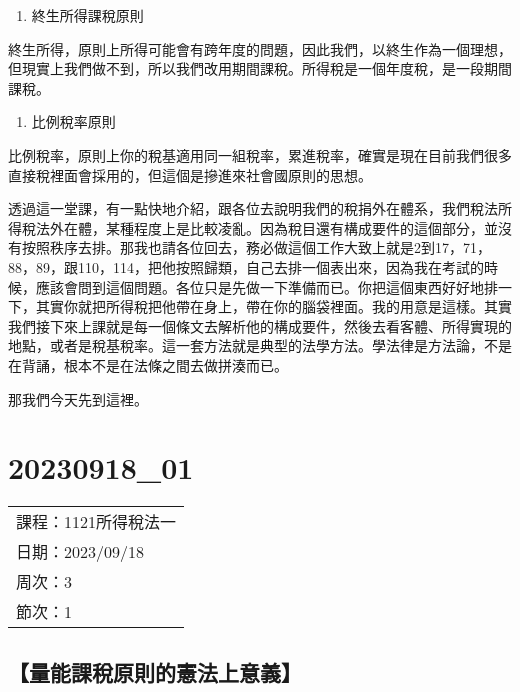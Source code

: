 \documentclass[]{ctexbook}
\providecommand{\tightlist}{%
  \setlength{\itemsep}{0pt}\setlength{\parskip}{0pt}}
\begin{document}
\begin{enumerate}
\def\labelenumi{\arabic{enumi}.}
\setcounter{enumi}{8}
\tightlist
\item
  終生所得課稅原則
\end{enumerate}

終生所得，原則上所得可能會有跨年度的問題，因此我們，以終生作為一個理想，但現實上我們做不到，所以我們改用期間課稅。所得稅是一個年度稅，是一段期間課稅。

\begin{enumerate}
\def\labelenumi{\arabic{enumi}.}
\setcounter{enumi}{9}
\tightlist
\item
  比例稅率原則
\end{enumerate}

比例稅率，原則上你的稅基適用同一組稅率，累進稅率，確實是現在目前我們很多直接稅裡面會採用的，但這個是摻進來社會國原則的思想。

透過這一堂課，有一點快地介紹，跟各位去說明我們的稅捐外在體系，我們稅法所得稅法外在體，某種程度上是比較凌亂。因為稅目還有構成要件的這個部分，並沒有按照秩序去排。那我也請各位回去，務必做這個工作大致上就是2到17，71，88，89，跟110，114，把他按照歸類，自己去排一個表出來，因為我在考試的時候，應該會問到這個問題。各位只是先做一下準備而已。你把這個東西好好地排一下，其實你就把所得稅把他帶在身上，帶在你的腦袋裡面。我的用意是這樣。其實我們接下來上課就是每一個條文去解析他的構成要件，然後去看客體、所得實現的地點，或者是稅基稅率。這一套方法就是典型的法學方法。學法律是方法論，不是在背誦，根本不是在法條之間去做拼湊而已。

那我們今天先到這裡。

\hypertarget{section-5}{%
\chapter{20230918\_01}\label{section-5}}

\begin{longtable}[]{@{}l@{}}
\toprule()
\endhead
課程：1121所得稅法一 \\
日期：2023/09/18 \\
周次：3 \\
節次：1 \\
\bottomrule()
\end{longtable}

\hypertarget{ux91cfux80fdux8ab2ux7a05ux539fux5247ux7684ux61b2ux6cd5ux4e0aux610fux7fa9}{%
\section{【量能課稅原則的憲法上意義】}\label{ux91cfux80fdux8ab2ux7a05ux539fux5247ux7684ux61b2ux6cd5ux4e0aux610fux7fa9}}
\end{document}
